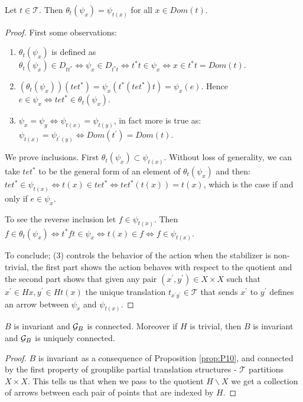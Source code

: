 \begin{corollary}
\begin{proposition}\label{prop:P10}
Let $t \in \mathcal{T}$. Then $\theta_{t}(\psi_{x})=\psi_{t(x)}$ for all $x \in Dom(t)$.
\end{proposition}
\begin{proof}
First some observations:
\begin{enumerate}
\item $\theta_{t}(\psi_{x})$ is defined as $\theta_{t}(\psi_{x}) \in D_{tt^{*}} \Leftrightarrow \psi_{x} \in D_{t^{*}t} \Leftrightarrow t^{*}t \in \psi_{x} \Leftrightarrow x \in t^{*}t = Dom(t)$.
\item $(\theta_{t}(\psi_{x}))(tet^{*})=\psi_{x}(t^{*}(tet^{*})t)=\psi_{x}(e)$. Hence $e \in \psi_{x} \Leftrightarrow tet^{*}  \in \theta_{t}(\psi_{x})$.
\item $\psi_{x}=\psi_{y} \Leftrightarrow \psi_{t(x)}=\psi_{t(y)}$, in fact more is true as: $\psi_{t(x)}=\psi_{t^{'}(y)} \Leftrightarrow Dom(t^{'})=Dom(t)$.
\end{enumerate}
We prove inclusions. First $\theta_{t}(\psi_{x}) \subset \psi_{t(x)}$. Without loss of generality, we can take $tet^{*}$ to be the general form of an element of $\theta_{t}(\psi_{x})$ and then: $tet^{*} \in \psi_{t(x)} \Leftrightarrow t(x) \in tet^{*} \Leftrightarrow tet^{*}(t(x))=t(x)$, which is the case if and only if $e \in \psi_{x}$.

To see the reverse inclusion let $f \in \psi_{t(x)}$. Then $f \in \theta_{t}(\psi_{x}) \Leftrightarrow t^{*}ft \in \psi_{x} \Leftrightarrow t(x) \in f \Leftrightarrow f \in \psi_{t(x)}$. 

To conclude; (3) controls the behavior of the action when the stabilizer is non-trivial, the first part shows the action behaves with respect to the quotient and the second part shows that given any pair $(x^{'},y^{'})\in X \times X$ such that $x^{'}\in Hx, y^{'}\in Ht(x)$ the unique translation $t_{x^{'}y^{'}} \in \mathcal{T}$ that sends $x^{'}$ to $y^{'}$ defines an arrow between $\psi_{x}$ and $\psi_{t(x)}$. 
\end{proof}

\begin{proposition}\label{cor:C4}
$B$ is invariant and $\mathcal{G}_{B}$ is connected. Moreover if $H$ is trivial, then $B$ is invariant and $\mathcal{G}_{B}$ is uniquely connected.
\end{proposition}
\begin{proof}
$B$ is invariant as a consequence of Proposition \ref{prop:P10}, and connected by the first property of grouplike partial translation structures - $\mathcal{T}$ partitions $X \times X$. This tells us that when we pass to the quotient $H \backslash X$ we get a collection of arrows between each pair of points that are indexed by $H$. 


\end{proof}
\end{corollary}
